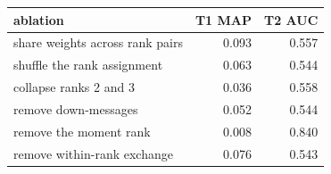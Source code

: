\setlength{\tabcolsep}{3pt}
\begin{tabular}{lrr}
\toprule
ablation & T1 MAP & T2 AUC \\
\midrule
share weights across rank pairs & 0.093 & 0.557 \\
shuffle the rank assignment & 0.063 & 0.544 \\
collapse ranks 2 and 3 & 0.036 & 0.558 \\
remove down-messages & 0.052 & 0.544 \\
remove the moment rank & 0.008 & 0.840 \\
remove within-rank exchange & 0.076 & 0.543 \\
\bottomrule
\end{tabular}